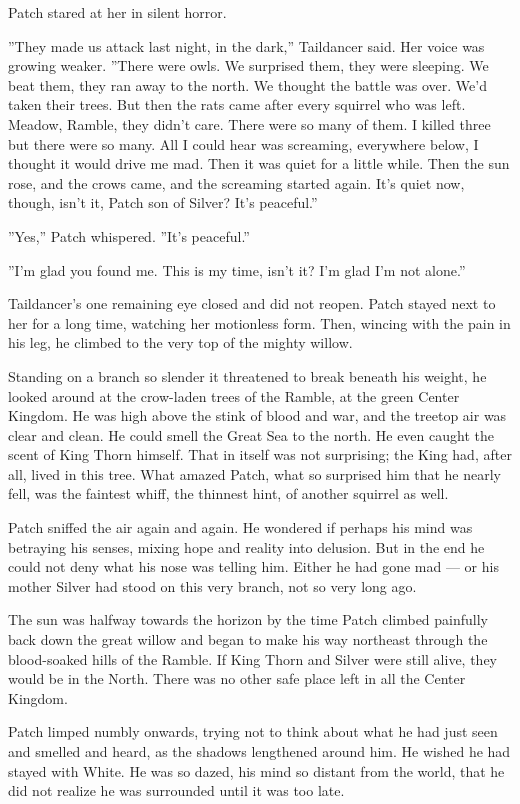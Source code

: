 \documentclass[12pt]{book}
\begin{document}
Patch stared at her in silent horror.

''They made us attack last night, in the dark,'' Taildancer said. Her voice was growing weaker. ''There were owls. We surprised them, they were sleeping. We beat them, they ran away to the north. We thought the battle was over. We'd taken their trees. But then the rats came after every squirrel who was left. Meadow, Ramble, they didn't care. There were so many of them. I killed three but there were so many. All I could hear was screaming, everywhere below, I thought it would drive me mad. Then it was quiet for a little while. Then the sun rose, and the crows came, and the screaming started again. It's quiet now, though, isn't it, Patch son of Silver? It's peaceful.''

''Yes,'' Patch whispered. ''It's peaceful.''

''I'm glad you found me. This is my time, isn't it? I'm glad I'm not alone.''

Taildancer's one remaining eye closed and did not reopen. Patch stayed next to her for a long time, watching her motionless form. Then, wincing with the pain in his leg, he climbed to the very top of the mighty willow.

Standing on a branch so slender it threatened to break beneath his weight, he looked around at the crow-laden trees of the Ramble, at the green Center Kingdom. He was high above the stink of blood and war, and the treetop air was clear and clean. He could smell the Great Sea to the north. He even caught the scent of King Thorn himself. That in itself was not surprising; the King had, after all, lived in this tree. What amazed Patch, what so surprised him that he nearly fell, was the faintest whiff, the thinnest hint, of another squirrel as well.

Patch sniffed the air again and again. He wondered if perhaps his mind was betraying his senses, mixing hope and reality into delusion. But in the end he could not deny what his nose was telling him. Either he had gone mad ---
or his mother Silver had stood on this very branch, not so very long ago.

The sun was halfway towards the horizon by the time Patch climbed painfully back down the great willow and began to make his way northeast through the blood-soaked hills of the Ramble. If King Thorn and Silver were still alive, they would be in the North. There was no other safe place left in all the Center Kingdom.

Patch limped numbly onwards, trying not to think about what he had just seen and smelled and heard, as the shadows lengthened around him. He wished he had stayed with White. He was so dazed, his mind so distant from the world, that he did not realize he was surrounded until it was too late.
\end{document}
